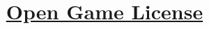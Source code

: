 \documentclass[fontsize=9pt,twoside]{scrreprt}
\begin{document}
\title{\normalfont\normalsize \uline{Open Game License}}

\author{}
\date{}
\maketitle


\end{document}
